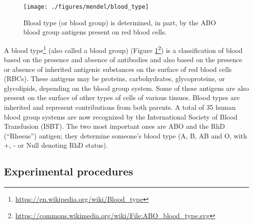 \documentclass[]{book}
\let\rmarkdownfootnote\footnote%
\def\footnote{\protect\rmarkdownfootnote}
\renewcommand{\href}[2]{#2\footnote{\url{#1}}}
\theoremstyle{definition}
\theoremstyle{definition}
\theoremstyle{definition}
\theoremstyle{remark}
\begin{document}
\begin{figure}

{\centering \texttt{[image: ./figures/mendel/blood\_type]} 

}

\caption{Blood type (or blood group) is determined, in part, by the
ABO blood group antigens present on red blood cells.}\label{fig:type}
\end{figure}

A \href{https://en.wikipedia.org/wiki/Blood_type}{blood type} (also
called a blood group)
(\href{https://commons.wikimedia.org/wiki/File:ABO_blood_type.svg}{Figure
\ref{fig:type}}) is a classification of blood based on the presence and
absence of antibodies and also based on the presence or absence of
inherited antigenic substances on the surface of red blood cells (RBCs).
These antigens may be proteins, carbohydrates, glycoproteins, or
glycolipids, depending on the blood group system. Some of these antigens
are also present on the surface of other types of cells of various
tissues. Blood types are inherited and represent contributions from both
parents. A total of 35 human blood group systems are now recognized by
the International Society of Blood Transfusion (ISBT). The two most
important ones are ABO and the RhD (``Rhesus'') antigen; they determine
someone's blood type (A, B, AB and O, with +, - or Null denoting RhD
status).

\subsection{Experimental procedures}\label{experimental-procedures-31}
\end{document}
